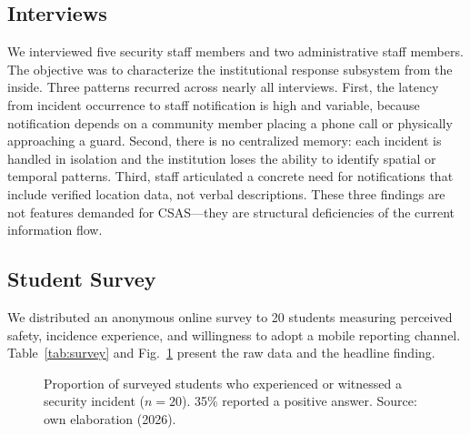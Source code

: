 \documentclass[conference]{IEEEtran}
\begin{document}
\subsection{Interviews}
We interviewed five security staff members and two administrative
staff members. The objective was to characterize the institutional
response subsystem from the inside. Three patterns recurred across
nearly all interviews. First, the latency from incident occurrence
to staff notification is high and variable, because notification
depends on a community member placing a phone call or physically
approaching a guard. Second, there is no centralized memory: each
incident is handled in isolation and the institution loses the ability
to identify spatial or temporal patterns. Third, staff articulated
a concrete need for notifications that include verified location
data, not verbal descriptions. These three findings are not features
demanded for CSAS---they are structural deficiencies of the current
information flow.

\subsection{Student Survey}
We distributed an anonymous online survey to 20 students measuring
perceived safety, incidence experience, and willingness to adopt a
mobile reporting channel. Table~\ref{tab:survey} and
Fig.~\ref{fig:pie} present the raw data and the headline finding.

\begin{table}[h]
\caption{Raw Survey Data (\(n=20\)). Variables: safety perception, incident experience, incident type, willingness to use an alert channel, and time of day.}
\label{tab:survey}
\centering
{}
\end{table}

\begin{figure}[h]
\centering
{}
\caption{Proportion of surveyed students who experienced or witnessed
a security incident (\(n=20\)). 35\% reported a positive answer.
Source: own elaboration (2026).}
\label{fig:pie}
\end{figure}
\end{document}
